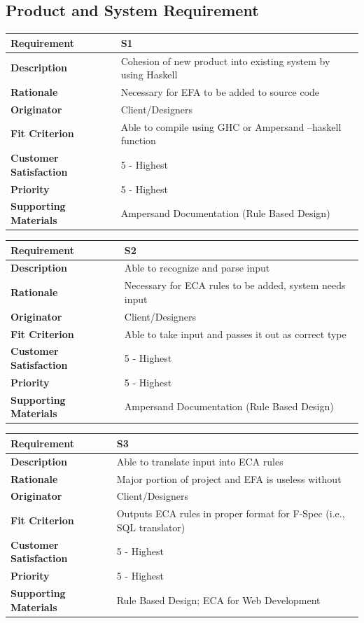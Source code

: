 \documentclass[12pt]{report}
\begin{document}
\subsection{Product and System Requirement}

{\setlength{\tabcolsep}{12pt} %
\begin{tabularx}{\textwidth}{>{\bfseries}m{3cm}X}
Requirement & S1 \\ 
\midrule
\endhead
Description  & Cohesion of new product into existing system by using Haskell  
\\	Rationale & Necessary for EFA to be added to source code 
\\	Originator & Client/Designers 
\\	Fit Criterion & Able to compile using GHC or Ampersand --haskell function  
\\	Customer Satisfaction & 5 - Highest
\\	Priority & 5 - Highest
\\	Supporting Materials & Ampersand Documentation (Rule Based Design) 
\vspace{12pt}
\end{tabularx}
}


{\setlength{\tabcolsep}{12pt} %
\begin{tabularx}{\textwidth}{>{\bfseries}m{3cm}X}
Requirement & S2 \\ 
\midrule
\endhead
	Description  & Able to recognize and parse input 
	\\	Rationale & Necessary for ECA rules to be added, system needs input 
	\\	Originator & Client/Designers 
	\\	Fit Criterion & Able to take input and passes it out as correct type 
	\\	Customer Satisfaction & 5 - Highest
	\\	Priority & 5 - Highest
	\\	Supporting Materials & Ampersand Documentation (Rule Based Design) 
\vspace{12pt}
\end{tabularx}
}



{\setlength{\tabcolsep}{12pt} %
\begin{tabularx}{\textwidth}{>{\bfseries}m{3cm}X}
Requirement & S3 \\ 
\midrule
\endhead
	Description  & Able to translate input into ECA rules 
	\\	Rationale & Major portion of project and EFA is useless without 
	\\	Originator & Client/Designers 
	\\	Fit Criterion & Outputs ECA rules in proper format for F-Spec (i.e., SQL 
	translator) 
	\\	Customer Satisfaction & 5 - Highest 
	\\	Priority & 5 - Highest 
	\\	Supporting Materials & Rule Based Design; ECA for Web Development %
\vspace{12pt}
\end{tabularx}
}
\end{document}
